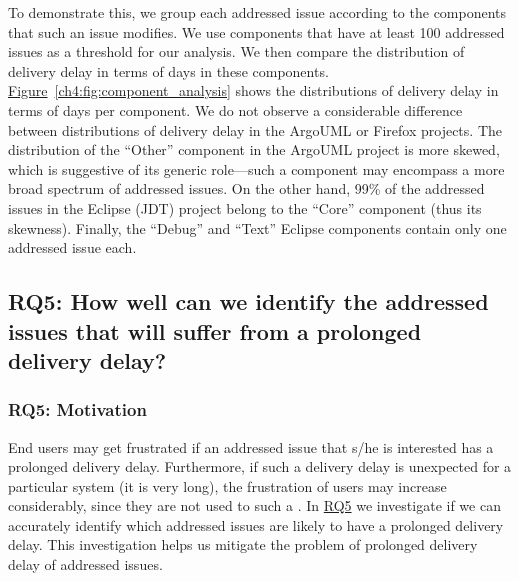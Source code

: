 \noindent\DIFdelbegin \textbf{\textit{}%
} %
\DIFdelend \DIFaddbegin {} \DIFaddend To demonstrate this, we group
each addressed issue according to the components that such an issue modifies. We use
components that have at least 100 addressed issues as a threshold for our analysis.
We then compare the distribution of delivery delay in terms of days in these
components.
\hyperref[ch4:fig:component_analysis]{Figure}~\ref{ch4:fig:component_analysis} shows the
distributions of delivery delay in terms of days per component. We do not
observe a considerable difference between distributions of delivery delay in
the ArgoUML or Firefox projects. The distribution of the ``Other'' component in
the ArgoUML project is more skewed, which is suggestive of its generic
role---such a component may encompass a more broad spectrum of addressed issues. On
the other hand, 99\% of the addressed issues in the Eclipse (JDT) project belong to
the ``Core'' component (thus its skewness). Finally, the ``Debug'' and ``Text''
Eclipse components contain only one addressed issue each.   


\subsection{RQ5: How well can we identify the addressed issues
that will suffer from a prolonged delivery delay?}\label{ch4:rq5}

\subsubsection*{RQ5: Motivation} 

End users may get frustrated if an addressed issue that s/he is interested has a
prolonged delivery delay. Furthermore, if such a delivery delay is unexpected for a
particular system (\eg it is very long), the frustration of users may increase
considerably, since they are not used to such a \DIFdelbegin {}\DIFdelend \DIFaddbegin {}\DIFaddend . In
\hyperref[ch4:rq5]{RQ5} we
investigate if we can accurately identify which addressed issues are likely to
have a prolonged delivery delay. This investigation helps us mitigate the problem of
prolonged delivery delay of addressed issues.

